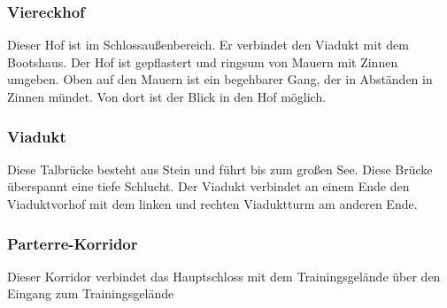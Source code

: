 \documentclass[a4paper, 10pt]{article}
\begin{document}
\subsubsection*{\large Viereckhof}
Dieser Hof ist im Schlossaußenbereich. Er verbindet den Viadukt mit dem Bootshaus. Der Hof ist gepflastert und ringsum von Mauern mit Zinnen umgeben. Oben auf den Mauern ist ein begehbarer Gang, der in Abständen in Zinnen mündet. Von dort ist der Blick in den Hof möglich.
\subsubsection*{\large Viadukt}
Diese Talbrücke besteht aus Stein und führt bis zum großen See. Diese Brücke überspannt eine tiefe Schlucht. Der Viadukt verbindet an einem Ende den Viaduktvorhof mit dem linken und rechten Viaduktturm am anderen Ende.
\subsubsection*{\large Parterre-Korridor}
Dieser Korridor verbindet das Hauptschloss mit dem Trainingsgelände über den Eingang zum Trainingsgelände
\end{document}
